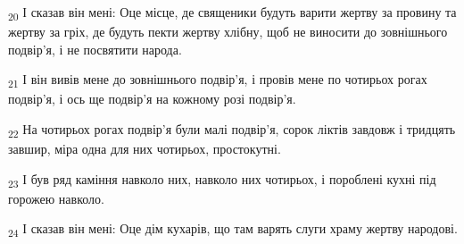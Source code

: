 \begin{tcolorbox}
\textsubscript{20} І сказав він мені: Оце місце, де священики будуть варити жертву за провину та жертву за гріх, де будуть пекти жертву хлібну, щоб не виносити до зовнішнього подвір'я, і не посвятити народа.
\end{tcolorbox}
\begin{tcolorbox}
\textsubscript{21} І він вивів мене до зовнішнього подвір'я, і провів мене по чотирьох рогах подвір'я, і ось ще подвір'я на кожному розі подвір'я.
\end{tcolorbox}
\begin{tcolorbox}
\textsubscript{22} На чотирьох рогах подвір'я були малі подвір'я, сорок ліктів завдовж і тридцять завшир, міра одна для них чотирьох, простокутні.
\end{tcolorbox}
\begin{tcolorbox}
\textsubscript{23} І був ряд каміння навколо них, навколо них чотирьох, і пороблені кухні під горожею навколо.
\end{tcolorbox}
\begin{tcolorbox}
\textsubscript{24} І сказав він мені: Оце дім кухарів, що там варять слуги храму жертву народові.
\end{tcolorbox}
